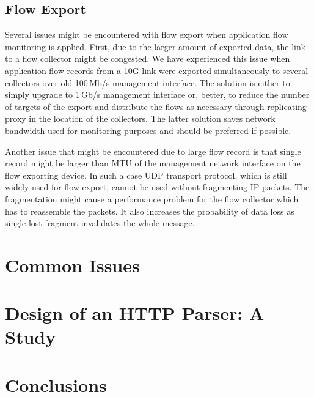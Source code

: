 \subsection{Flow Export}

Several issues might be encountered with flow export when application flow monitoring is applied. First, due to the larger amount of exported data, the link to a flow collector might be congested. We have experienced this issue when application flow records from a 10G link were exported simultaneously to several collectors over old 100\,Mb/s management interface. The solution is either to simply upgrade to 1\,Gb/s management interface or, better, to reduce the number of targets of the export and distribute the flows as necessary through replicating proxy in the location of the collectors. The latter solution saves network bandwidth used for monitoring purposes and should be preferred if possible.

Another issue that might be encountered due to large flow record is that single record might be larger than MTU of the management network interface on the flow exporting device. In such a case UDP transport protocol, which is still widely used for flow export, cannot be used without fragmenting IP packets. The fragmentation might cause a performance problem for the flow collector which has to reassemble the packets. It also increases the probability of data loss as single lost fragment invalidates the whole message.


\section{Common Issues} %


\section{Design of an HTTP Parser: A Study}\label{sec:http-parser-design} %

\section{Conclusions}\label{sec:app-conclusions}